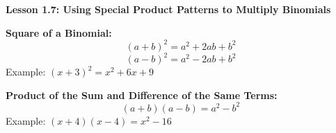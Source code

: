 \begin{center}
\textbf{Lesson 1.7: Using Special Product Patterns to Multiply Binomials}
\end{center}

\vspace*{1ex}

\noindent \textbf{Square of a Binomial:} 
    \[
    (a + b)^2 = a^2 + 2ab + b^2
    \]
    \[
    (a - b)^2 = a^2 - 2ab + b^2
    \]
    Example: \( (x + 3)^2 = x^2 + 6x + 9 \)

\noindent\textbf{Product of the Sum and Difference of the Same Terms:}
    \[
    (a + b)(a - b) = a^2 - b^2
    \]
    Example: \( (x + 4)(x - 4) = x^2 - 16 \)





